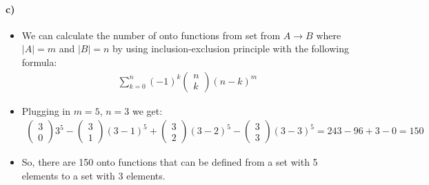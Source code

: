 \documentclass[12pt]{article}
\begin{document}
\paragraph*{c)}
\begin{itemize}
 \item We can calculate the number of onto functions from set from $A \rightarrow B$ where $|A|=m$ and $|B|=n$ by using inclusion-exclusion principle with the following formula:
\begin{equation*}
   \begin{split}
   \sum_{k=0}^{n}{(-1)^k \begin{pmatrix} n \\ k \end{pmatrix} (n-k)^m}
   \end{split}
\end{equation*}
\item Plugging in $m = 5$, $n = 3$ we get:
\begin{equation*}
   \begin{split}
   \begin{pmatrix} 3 \\ 0 \end{pmatrix}3^5 - \begin{pmatrix} 3 \\ 1 \end{pmatrix}(3-1)^5 + \begin{pmatrix} 3 \\ 2 \end{pmatrix}(3-2)^5 - \begin{pmatrix} 3 \\ 3 \end{pmatrix}(3-3)^5 = 243 - 96 + 3 - 0= 150
   \end{split}
\end{equation*}
\item So, there are 150 onto functions that can be defined from a set with 5 elements to a set with 3 elements.
\end{itemize}
\end{document}
